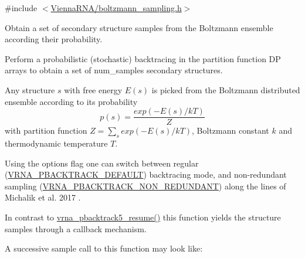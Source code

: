 {\ttfamily \#include $<$\mbox{\hyperlink{boltzmann__sampling_8h}{Vienna\+R\+N\+A/boltzmann\+\_\+sampling.\+h}}$>$}



Obtain a set of secondary structure samples from the Boltzmann ensemble according their probability. 

Perform a probabilistic (stochastic) backtracing in the partition function DP arrays to obtain a set of {\ttfamily num\+\_\+samples} secondary structures.

Any structure $ s $ with free energy $ E(s) $ is picked from the Boltzmann distributed ensemble according to its probability \[ p(s) = \frac{exp(-E(s) / kT)}{Z} \] with partition function $ Z = \sum_s exp(-E(s) / kT) $, Boltzmann constant $ k $ and thermodynamic temperature $ T $.

Using the {\ttfamily options} flag one can switch between regular (\mbox{\hyperlink{group__subopt__stochbt_ga760aa2fb2d5e3d7521a11454a21e9b9f}{V\+R\+N\+A\+\_\+\+P\+B\+A\+C\+K\+T\+R\+A\+C\+K\+\_\+\+D\+E\+F\+A\+U\+LT}}) backtracing mode, and non-\/redundant sampling (\mbox{\hyperlink{group__subopt__stochbt_ga9d580ce645aa0c38b69afdf56c332200}{V\+R\+N\+A\+\_\+\+P\+B\+A\+C\+K\+T\+R\+A\+C\+K\+\_\+\+N\+O\+N\+\_\+\+R\+E\+D\+U\+N\+D\+A\+NT}}) along the lines of Michalik et al. 2017 \cite{michalik:2017}.

In contrast to \mbox{\hyperlink{group__subopt__stochbt_gac5d7065196975b803daeb4e094ba1cb9}{vrna\+\_\+pbacktrack5\+\_\+resume()}} this function yields the structure samples through a callback mechanism.

A successive sample call to this function may look like\+: 
\begin{DoxyCode}{0}
\DoxyCodeLine{}
\DoxyCodeLine{\textcolor{comment}{// sample the first 100 structures}}
\DoxyCodeLine{}
\DoxyCodeLine{\textcolor{comment}{// sample another 500 structures}}
\DoxyCodeLine{}
\DoxyCodeLine{\textcolor{comment}{// release memory occupied by the non-redundant memory data structure}}
\end{DoxyCode}


